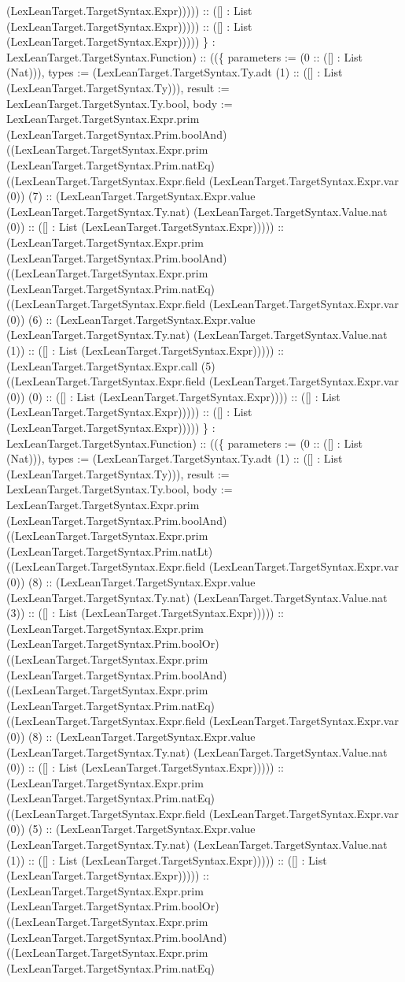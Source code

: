 \documentclass[11pt]{article}
\begin{document}
(LexLeanTarget.TargetSyntax.Expr))))) :: ([] : List (LexLeanTarget.TargetSyntax.Expr))))) :: ([] : List (LexLeanTarget.TargetSyntax.Expr))))) \} : LexLeanTarget.TargetSyntax.Function) :: ((\{ parameters := (0 :: ([] : List (Nat))), types := (LexLeanTarget.TargetSyntax.Ty.adt (1) :: ([] : List (LexLeanTarget.TargetSyntax.Ty))), result := LexLeanTarget.TargetSyntax.Ty.bool, body := LexLeanTarget.TargetSyntax.Expr.prim (LexLeanTarget.TargetSyntax.Prim.boolAnd) ((LexLeanTarget.TargetSyntax.Expr.prim (LexLeanTarget.TargetSyntax.Prim.natEq) ((LexLeanTarget.TargetSyntax.Expr.field (LexLeanTarget.TargetSyntax.Expr.var (0)) (7) :: (LexLeanTarget.TargetSyntax.Expr.value (LexLeanTarget.TargetSyntax.Ty.nat) (LexLeanTarget.TargetSyntax.Value.nat (0)) :: ([] : List (LexLeanTarget.TargetSyntax.Expr))))) :: (LexLeanTarget.TargetSyntax.Expr.prim (LexLeanTarget.TargetSyntax.Prim.boolAnd) ((LexLeanTarget.TargetSyntax.Expr.prim (LexLeanTarget.TargetSyntax.Prim.natEq) ((LexLeanTarget.TargetSyntax.Expr.field (LexLeanTarget.TargetSyntax.Expr.var (0)) (6) :: (LexLeanTarget.TargetSyntax.Expr.value (LexLeanTarget.TargetSyntax.Ty.nat) (LexLeanTarget.TargetSyntax.Value.nat (1)) :: ([] : List (LexLeanTarget.TargetSyntax.Expr))))) :: (LexLeanTarget.TargetSyntax.Expr.call (5) ((LexLeanTarget.TargetSyntax.Expr.field (LexLeanTarget.TargetSyntax.Expr.var (0)) (0) :: ([] : List (LexLeanTarget.TargetSyntax.Expr)))) :: ([] : List (LexLeanTarget.TargetSyntax.Expr))))) :: ([] : List (LexLeanTarget.TargetSyntax.Expr))))) \} : LexLeanTarget.TargetSyntax.Function) :: ((\{ parameters := (0 :: ([] : List (Nat))), types := (LexLeanTarget.TargetSyntax.Ty.adt (1) :: ([] : List (LexLeanTarget.TargetSyntax.Ty))), result := LexLeanTarget.TargetSyntax.Ty.bool, body := LexLeanTarget.TargetSyntax.Expr.prim (LexLeanTarget.TargetSyntax.Prim.boolAnd) ((LexLeanTarget.TargetSyntax.Expr.prim (LexLeanTarget.TargetSyntax.Prim.natLt) ((LexLeanTarget.TargetSyntax.Expr.field (LexLeanTarget.TargetSyntax.Expr.var (0)) (8) :: (LexLeanTarget.TargetSyntax.Expr.value (LexLeanTarget.TargetSyntax.Ty.nat) (LexLeanTarget.TargetSyntax.Value.nat (3)) :: ([] : List (LexLeanTarget.TargetSyntax.Expr))))) :: (LexLeanTarget.TargetSyntax.Expr.prim (LexLeanTarget.TargetSyntax.Prim.boolOr) ((LexLeanTarget.TargetSyntax.Expr.prim (LexLeanTarget.TargetSyntax.Prim.boolAnd) ((LexLeanTarget.TargetSyntax.Expr.prim (LexLeanTarget.TargetSyntax.Prim.natEq) ((LexLeanTarget.TargetSyntax.Expr.field (LexLeanTarget.TargetSyntax.Expr.var (0)) (8) :: (LexLeanTarget.TargetSyntax.Expr.value (LexLeanTarget.TargetSyntax.Ty.nat) (LexLeanTarget.TargetSyntax.Value.nat (0)) :: ([] : List (LexLeanTarget.TargetSyntax.Expr))))) :: (LexLeanTarget.TargetSyntax.Expr.prim (LexLeanTarget.TargetSyntax.Prim.natEq) ((LexLeanTarget.TargetSyntax.Expr.field (LexLeanTarget.TargetSyntax.Expr.var (0)) (5) :: (LexLeanTarget.TargetSyntax.Expr.value (LexLeanTarget.TargetSyntax.Ty.nat) (LexLeanTarget.TargetSyntax.Value.nat (1)) :: ([] : List (LexLeanTarget.TargetSyntax.Expr))))) :: ([] : List (LexLeanTarget.TargetSyntax.Expr))))) :: (LexLeanTarget.TargetSyntax.Expr.prim (LexLeanTarget.TargetSyntax.Prim.boolOr) ((LexLeanTarget.TargetSyntax.Expr.prim (LexLeanTarget.TargetSyntax.Prim.boolAnd) ((LexLeanTarget.TargetSyntax.Expr.prim (LexLeanTarget.TargetSyntax.Prim.natEq) 
\end{document}
